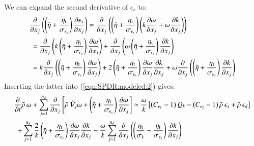 \documentclass{warpdoc}
\newcommand{\alb}{\vspace{0.2cm}\\} %
\newcommand{\nd}{{{n}_{\rm d}}}
\newcommand{\turb}{_{\rm t}}
\newcommand{\etat}{{\eta\turb}}
\newcommand{\mfd}{\displaystyle}
\begin{document}
%
We can expand the second derivative of $\epsilon_s$ to:
%
\begin{equation}
 \begin{array}{l}
  \mfd\frac{\partial }{\partial x_j} \left( \left( \wbar{\eta} +\frac{\etat}{\sigma_{\epsilon_s}} \right)\frac{\partial \epsilon_s}{\partial x_j} \right)
    =\mfd\frac{\partial }{\partial x_j} \left( \left( \wbar{\eta} +\frac{\etat}{\sigma_{\epsilon_s}} \right)\left( k \frac{\partial \omega}{\partial x_j} +\omega \frac{\partial k}{\partial x_j}\right)\right)
   \alb~~
    =\mfd\frac{\partial }{\partial x_j} \left( k\left( \wbar{\eta} +\frac{\etat}{\sigma_{\epsilon_s}} \right)\frac{\partial \omega}{\partial x_j} \right)
          +\frac{\partial }{\partial x_j} \left( \omega \left( \wbar{\eta} +\frac{\etat}{\sigma_{\epsilon_s}} \right) \frac{\partial k}{\partial x_j}\right)
   \alb~~
    =
          \mfd k\frac{\partial }{\partial x_j} \left( \left( \wbar{\eta} +\frac{\etat}{\sigma_{\epsilon_s}} \right)\frac{\partial \omega}{\partial x_j} \right)
          +2\left( \wbar{\eta} +\frac{\etat}{\sigma_{\epsilon_s}} \right)\frac{\partial \omega}{\partial x_j}    \frac{\partial k}{\partial x_j}
          +\mfd\omega\frac{\partial }{\partial x_j} \left( \left( \wbar{\eta} +\frac{\etat}{\sigma_{\epsilon_s}} \right) \frac{\partial k}{\partial x_j}\right)
 \end{array}
\end{equation}
%
Inserting the latter into (\ref{eqn:SPDR:modeled:2}) gives:
%
\begin{equation}
  \begin{array}{l}
    \mfd\frac{\partial }{\partial t}\wbar{\rho}\,\omega+\sum_{j=1}^\nd \frac{\partial}{\partial x_j}
            \left[
                \wbar{\rho}\, {\wtilde{\bm{V}}_j} \omega
               +\left( \wbar{\eta} +\frac{\etat}{\sigma_{\epsilon_s}} \right)\frac{\partial \omega}{\partial x_j}
            \right]
       \approx  \frac{\omega}{k}
         \left[
            \left(C_{\epsilon_1}-1\right) Q_k
           -\left(C_{\epsilon_2}-1\right) \wbar{\rho}\, \epsilon_s
           +\wbar{\rho}\, \epsilon_d
         \right]
  \alb~~
  +\mfd\sum_{j=1}^\nd \frac{2}{k}\left( \wbar{\eta} +\frac{\etat}{\sigma_{\epsilon_s}} \right)\frac{\partial \omega}{\partial x_j}    \frac{\partial k}{\partial x_j}
  -\mfd\frac{\omega}{k}
     \sum_{j=1}^{\nd} \frac{\partial }{\partial x_j}
     \left( \left( \frac{\etat}{\sigma_k}-\frac{\etat}{\sigma_{\epsilon_s}} \right) \frac{\partial k}{\partial x_j} \right)
  \end{array}
  \label{eqn:SPDR:modeled:final}
\end{equation}
%
\end{document}
